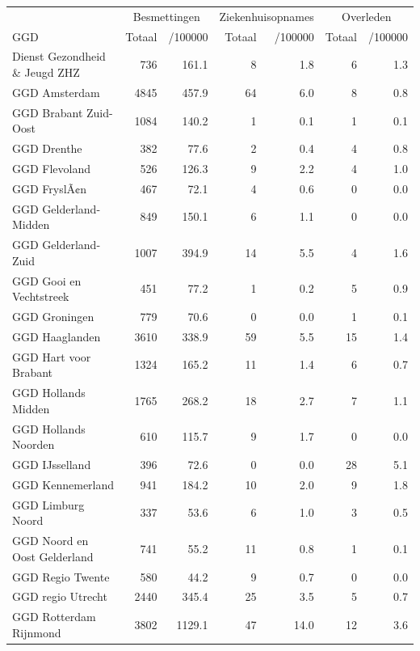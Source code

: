 \documentclass[
  english,
  man,floatsintext]{apa6}
\begin{document}
\begin{table}[H]
\centering\begingroup\fontsize{10}{12}\selectfont

\begin{threeparttable}
\begin{tabular}{lrrrrrr}
\toprule
\multicolumn{1}{c}{ } & \multicolumn{2}{c}{Besmettingen} & \multicolumn{2}{c}{Ziekenhuisopnames} & \multicolumn{2}{c}{Overleden} \\
\cmidrule(l{3pt}r{3pt}){2-3} \cmidrule(l{3pt}r{3pt}){4-5} \cmidrule(l{3pt}r{3pt}){6-7}
GGD & Totaal & /100000 & Totaal & /100000 & Totaal & /100000\\
\midrule
Dienst Gezondheid \& Jeugd ZHZ & 736 & 161.1 & 8 & 1.8 & 6 & 1.3\\
GGD Amsterdam & 4845 & 457.9 & 64 & 6.0 & 8 & 0.8\\
GGD Brabant Zuid-Oost & 1084 & 140.2 & 1 & 0.1 & 1 & 0.1\\
GGD Drenthe & 382 & 77.6 & 2 & 0.4 & 4 & 0.8\\
GGD Flevoland & 526 & 126.3 & 9 & 2.2 & 4 & 1.0\\
GGD FryslÃ¢n & 467 & 72.1 & 4 & 0.6 & 0 & 0.0\\
GGD Gelderland-Midden & 849 & 150.1 & 6 & 1.1 & 0 & 0.0\\
GGD Gelderland-Zuid & 1007 & 394.9 & 14 & 5.5 & 4 & 1.6\\
GGD Gooi en Vechtstreek & 451 & 77.2 & 1 & 0.2 & 5 & 0.9\\
GGD Groningen & 779 & 70.6 & 0 & 0.0 & 1 & 0.1\\
GGD Haaglanden & 3610 & 338.9 & 59 & 5.5 & 15 & 1.4\\
GGD Hart voor Brabant & 1324 & 165.2 & 11 & 1.4 & 6 & 0.7\\
GGD Hollands Midden & 1765 & 268.2 & 18 & 2.7 & 7 & 1.1\\
GGD Hollands Noorden & 610 & 115.7 & 9 & 1.7 & 0 & 0.0\\
GGD IJsselland & 396 & 72.6 & 0 & 0.0 & 28 & 5.1\\
GGD Kennemerland & 941 & 184.2 & 10 & 2.0 & 9 & 1.8\\
GGD Limburg Noord & 337 & 53.6 & 6 & 1.0 & 3 & 0.5\\
GGD Noord en Oost Gelderland & 741 & 55.2 & 11 & 0.8 & 1 & 0.1\\
GGD Regio Twente & 580 & 44.2 & 9 & 0.7 & 0 & 0.0\\
GGD regio Utrecht & 2440 & 345.4 & 25 & 3.5 & 5 & 0.7\\
GGD Rotterdam Rijnmond & 3802 & 1129.1 & 47 & 14.0 & 12 & 3.6\\

\end{tabular}
\end{threeparttable}
\end{table}
\end{document}
